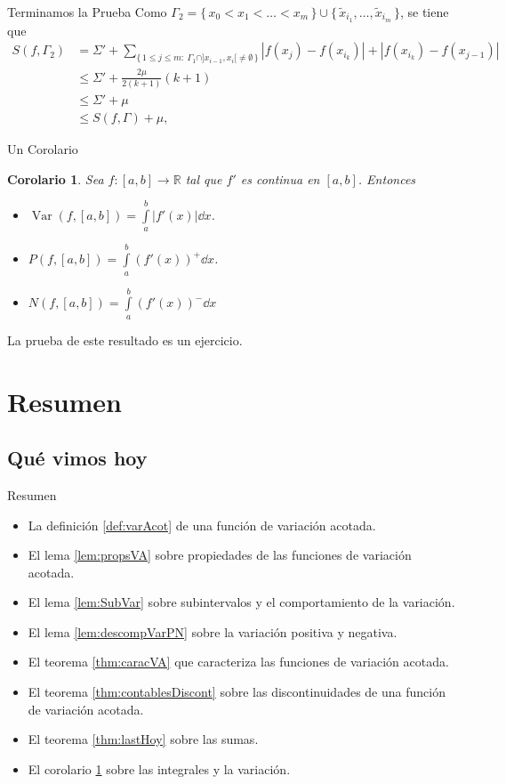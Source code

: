 \documentclass[utf8]{beamer}
\theoremstyle{plain}
\newtheorem{Cor}{Corolario}            %
\theoremstyle{definition}
\theoremstyle{remark}
\numberwithin{equation}{section}
\newcommand{\Ga}{\Gamma}                %
\newcommand{\Sg}{\Sigma}                %
\newcommand{\bR}{\mathbb{R}}    %
\newcommand{\set}[1]{\{\,#1\,\}}    %
\renewcommand{\leq}{\leqslant}          %
\renewcommand{\.}{\Cdot}                %
\DeclareMathOperator{\Var}{Var}     %
\begin{document}
\begin{frame}{Terminamos la Prueba}
  Como $\Ga_2=\set{x_0<x_1<\dots<x_m}\cup\set{\tilde{x}_{i_1},\dots,\tilde{x}_{i_m}}$, se tiene que 
  \begin{align*}
    S(f,\Ga_2)&=\Sg'+\sum_{\set{1\leq j\leq m:\ \Ga_1\cap]x_{i-1},x_i[\neq\emptyset}}|f(x_j)-f(x_{i_k})|+|f(x_{i_k})-f(x_{j-1})|\\
    &\leq \Sg'+\frac{2\mu}{2(k+1)}(k+1)\\
    &\leq \Sg'+\mu\\
    &\leq S(f,\Ga)+\mu,
  \end{align*}
\end{frame}

\begin{frame}{Un Corolario}
  \begin{Cor}\label{cor:intsYVar}
Sea $f:[a,b]\to\bR$ tal que $f'$ es continua en $[a,b]$. Entonces 
\begin{itemize}
  \item $\Var(f,[a,b])=\int\limits_a^b|f'(x)|\dd x$.
  \item $P(f,[a,b])=\int\limits_a^b(f'(x))^+\dd x$.
  \item $N(f,[a,b])=\int\limits_a^b(f'(x))^-\dd x$
\end{itemize}
  \end{Cor}
  La prueba de este resultado es un \alert{ejercicio}.
\end{frame}
\section*{Resumen}

\subsection*{Qu\'e vimos hoy}

\begin{frame}{Resumen}

  \begin{itemize}
  \item La definición \ref{def:varAcot} de una función de variación acotada.
  \item El lema \ref{lem:propsVA} sobre propiedades de las funciones de variación acotada. 
  \item El lema \ref{lem:SubVar} sobre subintervalos y el comportamiento de la variación.
  \item El lema \ref{lem:descompVarPN} sobre la variación positiva y negativa.
  \item El teorema \ref{thm:caracVA} que caracteriza las funciones de variación acotada.
  \item El teorema \ref{thm:contablesDiscont} sobre las discontinuidades de una función de variación acotada. 
  \item El teorema \ref{thm:lastHoy} sobre las sumas. %
  \item El corolario \ref{cor:intsYVar} sobre las integrales y la variación.
  \end{itemize}
  
\end{frame}
\end{document}
